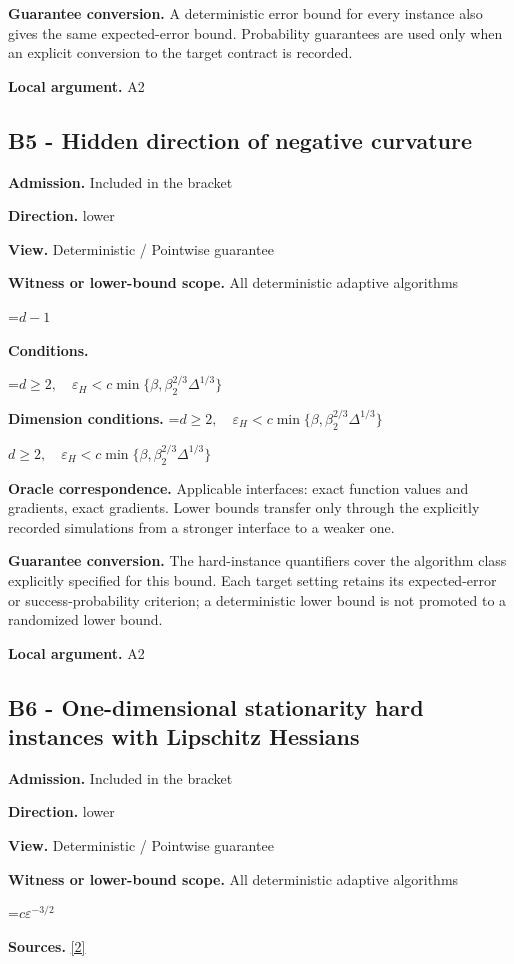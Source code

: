 \documentclass[10pt,a4paper]{article}
\newcommand{\AtlasMath}[1]{\par\begingroup\centering\setbox0=\hbox{$\displaystyle #1$}\ifdim\wd0>1.4\linewidth\typeout{ATLAS WIDE FORMULA: \the\wd0}\fi\ifdim\wd0>\linewidth\resizebox{\linewidth}{!}{\box0}\else\box0\fi\par\endgroup}
\newcommand{\AtlasInlineMath}[1]{\begingroup\setbox0=\hbox{$#1$}\ifdim\wd0>.4\linewidth\endgroup\AtlasMath{#1}\else\endgroup$#1$\fi}
\begin{document}
\textbf{Guarantee conversion.} A deterministic error bound for every instance also gives the same expected-error bound. Probability guarantees are used only when an explicit conversion to the target contract is recorded.

\textbf{Local argument.} A2

\subsection{B5 - Hidden direction of negative curvature}
\textbf{Admission.} Included in the bracket

\textbf{Direction.} lower

\textbf{View.} Deterministic / Pointwise guarantee

\textbf{Witness or lower-bound scope.} All deterministic adaptive algorithms

\AtlasMath{d-1}
\textbf{Conditions.} 
\AtlasMath{d\ge2,\quad\varepsilon_H<c\min\{\beta,\beta_2^{2/3}\Delta^{1/3}\}}


\textbf{Dimension conditions.} \AtlasInlineMath{d\ge2,\quad\varepsilon_H<c\min\{\beta,\beta_2^{2/3}\Delta^{1/3}\}}

\textbf{Oracle correspondence.} Applicable interfaces: exact function values and gradients, exact gradients. Lower bounds transfer only through the explicitly recorded simulations from a stronger interface to a weaker one.

\textbf{Guarantee conversion.} The hard-instance quantifiers cover the algorithm class explicitly specified for this bound. Each target setting retains its expected-error or success-probability criterion; a deterministic lower bound is not promoted to a randomized lower bound.

\textbf{Local argument.} A2

\subsection{B6 - One-dimensional stationarity hard instances with Lipschitz Hessians}
\textbf{Admission.} Included in the bracket

\textbf{Direction.} lower

\textbf{View.} Deterministic / Pointwise guarantee

\textbf{Witness or lower-bound scope.} All deterministic adaptive algorithms

\AtlasMath{c\varepsilon^{-3/2}}
\textbf{Sources.} \href{https://arxiv.org/abs/2610.16295}{[2]}
\end{document}
